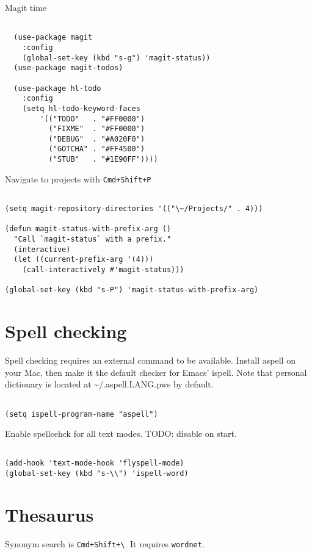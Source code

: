 \documentclass[11pt]{article}
\begin{document}
Magit time

\begin{verbatim}

  (use-package magit
    :config
    (global-set-key (kbd "s-g") 'magit-status))
  (use-package magit-todos)

  (use-package hl-todo
    :config
    (setq hl-todo-keyword-faces
        '(("TODO"   . "#FF0000")
          ("FIXME"  . "#FF0000")
          ("DEBUG"  . "#A020F0")
          ("GOTCHA" . "#FF4500")
          ("STUB"   . "#1E90FF"))))
\end{verbatim}

Navigate to projects with \texttt{Cmd+Shift+P}

\begin{verbatim}

(setq magit-repository-directories '(("\~/Projects/" . 4)))

(defun magit-status-with-prefix-arg ()
  "Call `magit-status` with a prefix."
  (interactive)
  (let ((current-prefix-arg '(4)))
    (call-interactively #'magit-status)))

(global-set-key (kbd "s-P") 'magit-status-with-prefix-arg)

\end{verbatim}

\section{Spell checking}
\label{sec:orgb71aaec}
Spell checking requires an external command to be available. Install aspell on your Mac, then make it the default checker for Emacs’ ispell. Note that personal dictionary is located at \textasciitilde{}/.aspell.LANG.pws by default.

\begin{verbatim}

(setq ispell-program-name "aspell")

\end{verbatim}

Enable spellcehck for all text modes. TODO: disable on start.

\begin{verbatim}

(add-hook 'text-mode-hook 'flyspell-mode)
(global-set-key (kbd "s-\\") 'ispell-word)

\end{verbatim}

\section{Thesaurus}
\label{sec:org3d7770d}
Synonym search is \texttt{Cmd+Shift+\textbackslash{}}. It requires \texttt{wordnet}.
\end{document}
